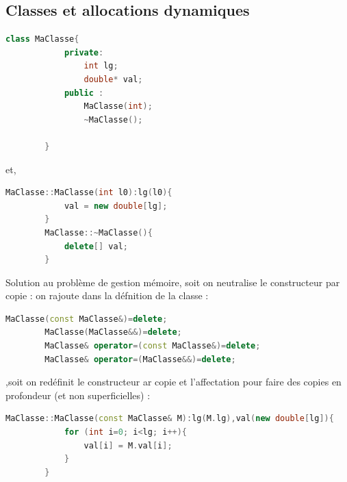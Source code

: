 \documentclass[12pt,a4paper]{article}
\begin{document}
	\subsection{Classes et allocations dynamiques}
	
	\begin{lstlisting}[language=C++,caption=MaClasse.h]
		class MaClasse{
			private:
				int lg;
				double* val;
			public :
				MaClasse(int);
				~MaClasse();
				
		}
	\end{lstlisting}
	
	et,
	
	\begin{lstlisting}[language=C++,caption=MaClasse.cpp]
		MaClasse::MaClasse(int l0):lg(l0){
			val = new double[lg];
		}
		MaClasse::~MaClasse(){
			delete[] val;
		}
	\end{lstlisting}
	
	Solution au problème de gestion mémoire, soit on neutralise le constructeur par copie : on rajoute dans la défnition de la classe : 
	
	\begin{lstlisting}[language=C++]
		MaClasse(const MaClasse&)=delete;
		MaClasse(MaClasse&&)=delete;
		MaClasse& operator=(const MaClasse&)=delete;
		MaClasse& operator=(MaClasse&&)=delete;
	\end{lstlisting}
	
	,soit on redéfinit le constructeur ar copie et l'affectation pour faire des copies en profondeur (et non superficielles) :
	
	\begin{lstlisting}[language=C++]
		MaClasse::MaClasse(const MaClasse& M):lg(M.lg),val(new double[lg]){
			for (int i=0; i<lg; i++){
				val[i] = M.val[i];
			}
		}
	\end{lstlisting}
	
	
	
\end{document}

